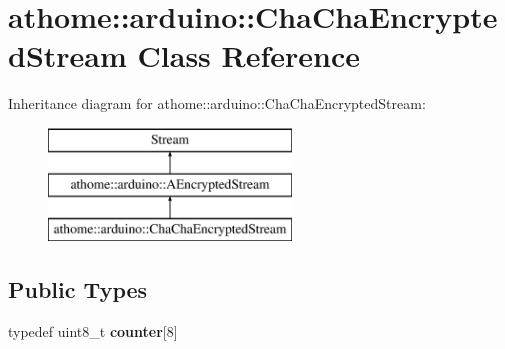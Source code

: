 \hypertarget{classathome_1_1arduino_1_1_cha_cha_encrypted_stream}{}\section{athome\+:\+:arduino\+:\+:Cha\+Cha\+Encrypted\+Stream Class Reference}
\label{classathome_1_1arduino_1_1_cha_cha_encrypted_stream}
Inheritance diagram for athome\+:\+:arduino\+:\+:Cha\+Cha\+Encrypted\+Stream\+:\begin{figure}[H]
\begin{center}
\leavevmode
\includegraphics[height=3.000000cm]{classathome_1_1arduino_1_1_cha_cha_encrypted_stream}
\end{center}
\end{figure}
\subsection*{Public Types}
\begin{DoxyCompactItemize}
\item 
\mbox{\label{classathome_1_1arduino_1_1_cha_cha_encrypted_stream_a3db50f0956a60c6fc628e2a7873c5b0e}} 
typedef uint8\+\_\+t {\bfseries counter}\mbox{[}8\mbox{]}
\end{DoxyCompactItemize}
